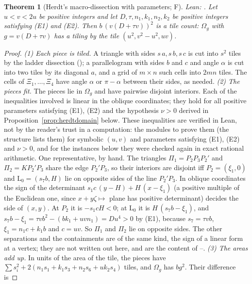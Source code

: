 \documentclass[11pt,reqno]{amsart}
\theoremstyle{plain}
\newtheorem{theorem}{Theorem}[section]
\theoremstyle{definition}
\newcommand{\sF}{\textup{\textsf{F}}}
\begin{document}
\begin{theorem}[Herdt's macro-dissection with parameters; \sF{}]\label{thm:herdtfamily}
{\small\noindent\emph{Lean:} .}
Let $u<v<2u$ be positive integers and let $D,\tau,n_1,k_1,n_2,k_2$ be positive integers satisfying \textup{(E1)} and \textup{(E2)}. Then $b\,(v(D+\tau v))^2$ is a tile count: $\Omega_{g}$ with $g=v(D+\tau v)$ has a tiling by the tile $(u^2,v^2-u^2,uv)$.
\end{theorem}
\begin{proof}
\emph{(1) Each piece is tiled.} A triangle with sides $s\,a,s\,b,s\,c$ is cut into $s^2$ tiles by the ladder dissection (); a parallelogram with sides $b$ and $c$ and angle $\alpha$ is cut into two tiles by its diagonal $a$, and a grid of $m\times n$ such cells into $2mn$ tiles. The cells of $\Xi_1,\dots,\Xi_4$ have angle $\alpha$ or $\pi-\alpha$ between their sides, as needed.
\emph{(2) The pieces fit.} The pieces lie in $\Omega_{g}$ and have pairwise disjoint interiors. Each of the inequalities involved is linear in the oblique coordinates; they hold for all positive parameters satisfying \textup{(E1)}, \textup{(E2)} and the hypothesis $\nu>0$ derived in Proposition~\ref{prop:herdtdomain} below. These inequalities are verified in Lean, not by the reader's trust in a computation: the modules  to  prove them (the structure  lists them) for symbolic $(u,v)$ and parameters satisfying \textup{(E1)}, \textup{(E2)} and $\nu>0$, and for the instances below they were checked again in exact rational arithmetic. One representative, by hand. The triangles $\Pi_1=P_2P_3P_2'$ and $\Pi_2=KP_2'P_3$ share the edge $P_2'P_3$, so their interiors are disjoint iff $P_2=(\xi_1,0)$ and $\mathrm{L}_0=(s_7b,H)$ lie on opposite sides of the line $P_2'P_3$. In oblique coordinates the sign of the determinant $s_1c\,(y-H)+H\,(x-\xi_1)$ (a positive multiple of the Euclidean one, since $x+y\zeta\mapsto$ plane has positive determinant) decides the side of $(x,y)$. At $P_2$ it is $-s_1cH<0$; at $\mathrm{L}_0$ it is $H\,(s_7b-\xi_1)$, and $s_7b-\xi_1=\tau vb^2-(bk_1+uvn_1)=Du^4>0$ by \textup{(E1)}, because $s_7=\tau vb$, $\xi_1=n_1c+k_1b$ and $c=uv$. So $\Pi_1$ and $\Pi_2$ lie on opposite sides. The other separations and the containments are of the same kind, the sign of a linear form at a vertex; they are not written out here, and are the content of --.
\emph{(3) The areas add up.} In units of the area of the tile, the pieces have $\sum s_i^2+2(n_1s_1+k_1s_3+n_2s_6+uk_2s_4)$ tiles, and $\Omega_{g}$ has $bg^2$. Their difference is

\end{proof}
\end{document}
